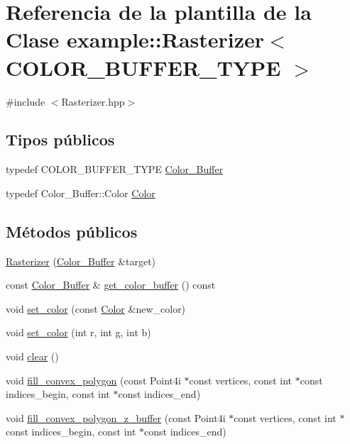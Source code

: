 \hypertarget{classexample_1_1_rasterizer}{}\section{Referencia de la plantilla de la Clase example\+::Rasterizer$<$ C\+O\+L\+O\+R\+\_\+\+B\+U\+F\+F\+E\+R\+\_\+\+T\+Y\+PE $>$}
\label{classexample_1_1_rasterizer}


{\ttfamily \#include $<$Rasterizer.\+hpp$>$}

\subsection*{Tipos públicos}
\begin{DoxyCompactItemize}
\item 
typedef C\+O\+L\+O\+R\+\_\+\+B\+U\+F\+F\+E\+R\+\_\+\+T\+Y\+PE \mbox{\hyperlink{classexample_1_1_rasterizer_a710beccb975a5f1aa771c44f784da525}{Color\+\_\+\+Buffer}}
\item 
typedef Color\+\_\+\+Buffer\+::\+Color \mbox{\hyperlink{classexample_1_1_rasterizer_aabfa22a5aef17d16a0cfb362fa30e69b}{Color}}
\end{DoxyCompactItemize}
\subsection*{Métodos públicos}
\begin{DoxyCompactItemize}
\item 
\mbox{\hyperlink{classexample_1_1_rasterizer_abd4a31e3b3bc495d66c0d05df25885a1}{Rasterizer}} (\mbox{\hyperlink{classexample_1_1_rasterizer_a710beccb975a5f1aa771c44f784da525}{Color\+\_\+\+Buffer}} \&target)
\item 
const \mbox{\hyperlink{classexample_1_1_rasterizer_a710beccb975a5f1aa771c44f784da525}{Color\+\_\+\+Buffer}} \& \mbox{\hyperlink{classexample_1_1_rasterizer_a21b94302fba144872555e84af362f87c}{get\+\_\+color\+\_\+buffer}} () const
\item 
void \mbox{\hyperlink{classexample_1_1_rasterizer_a6770b1e636262a2977ee2ccca726b134}{set\+\_\+color}} (const \mbox{\hyperlink{classexample_1_1_rasterizer_aabfa22a5aef17d16a0cfb362fa30e69b}{Color}} \&new\+\_\+color)
\item 
void \mbox{\hyperlink{classexample_1_1_rasterizer_a0043c4af15566e7f0463a22c04c67812}{set\+\_\+color}} (int r, int g, int b)
\item 
void \mbox{\hyperlink{classexample_1_1_rasterizer_a98cb1b7667d18c7038c964e5551d6d56}{clear}} ()
\item 
void \mbox{\hyperlink{classexample_1_1_rasterizer_ae8d8136137381542b9e1ac4ddc410aaa}{fill\+\_\+convex\+\_\+polygon}} (const Point4i $\ast$const vertices, const int $\ast$const indices\+\_\+begin, const int $\ast$const indices\+\_\+end)
\item 
void \mbox{\hyperlink{classexample_1_1_rasterizer_a54faf27d2f9ac25948051944bd5b5d0d}{fill\+\_\+convex\+\_\+polygon\+\_\+z\+\_\+buffer}} (const Point4i $\ast$const vertices, const int $\ast$const indices\+\_\+begin, const int $\ast$const indices\+\_\+end)
\end{DoxyCompactItemize}


